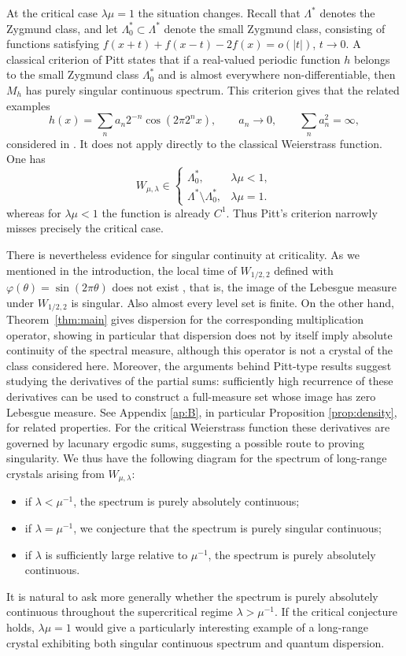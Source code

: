 \documentclass[11pt]{amsart}
\theoremstyle{plain}
\theoremstyle{definition}
\numberwithin{equation}{section}
\begin{document}
At the critical case $\lambda\mu=1$ the situation changes. Recall that $\Lambda^\ast$ denotes the Zygmund class, and let $\Lambda^\ast_0\subset\Lambda^\ast$ denote the small Zygmund class, consisting of functions satisfying $
f(x+t)+f(x-t)-2f(x)=o(|t|)$, $t\to0.$ A classical criterion of Pitt \cite{AndersonHousworthPitt} states that if a real-valued periodic function $h$ belongs to the small Zygmund class $\Lambda^\ast_0$ and is almost everywhere non-differentiable, then $M_h$ has purely singular continuous spectrum. This criterion gives that the related examples
$$
h(x)=\sum_n a_n2^{-n}\cos(2\pi2^nx),\qquad
a_n\to0,\qquad \sum_n a_n^2=\infty,
$$
considered in \cite{KernerPostSabriTaufer}. It does not apply directly to the classical Weierstrass function. One has
$$
W_{\mu,\lambda}\in
\begin{cases}
\Lambda^\ast_0, & \lambda\mu<1,\\
\Lambda^\ast\setminus\Lambda^\ast_0, & \lambda\mu=1.
\end{cases}
$$
whereas for $\lambda\mu<1$ the function is already $C^1$. Thus Pitt's criterion narrowly misses precisely the critical case.

There is nevertheless evidence for singular continuity at criticality. As we mentioned in the introduction, the local time of $W_{1/2,2}$ defined with $\varphi(\theta)=\sin(2\pi\theta)$ does not exist \cite{Buc}, that is, the image of the Lebesgue measure under $W_{1/2,2}$ is singular. Also almost every level set is finite. On the other hand, Theorem~\ref{thm:main} gives dispersion for the corresponding multiplication operator, showing in particular that dispersion does not by itself imply absolute continuity of the spectral measure, although this operator is not a crystal of the class considered here. Moreover, the arguments behind Pitt-type results suggest studying the derivatives of the partial sums: sufficiently high recurrence of these derivatives can be used to construct a full-measure set whose image has zero Lebesgue measure. See Appendix \ref{ap:B}, in particular Proposition \ref{prop:density}, for related properties. For the critical Weierstrass function these derivatives are governed by lacunary ergodic sums, suggesting a possible route to proving singularity. We thus have the following diagram for the spectrum of long-range crystals arising from $W_{\mu,\lambda}$:
\begin{itemize}
\item if $\lambda<\mu^{-1}$, the spectrum is purely absolutely continuous;
\item if $\lambda=\mu^{-1}$, we conjecture that the spectrum is purely singular continuous;
\item if $\lambda$ is sufficiently large relative to $\mu^{-1}$, the spectrum is purely absolutely continuous.
\end{itemize}
It is natural to ask more generally whether the spectrum is purely absolutely continuous throughout the supercritical regime $\lambda>\mu^{-1}$. If the critical conjecture holds, $\lambda\mu=1$ would give a particularly interesting example of a long-range crystal exhibiting both singular continuous spectrum and quantum dispersion.
\end{document}
